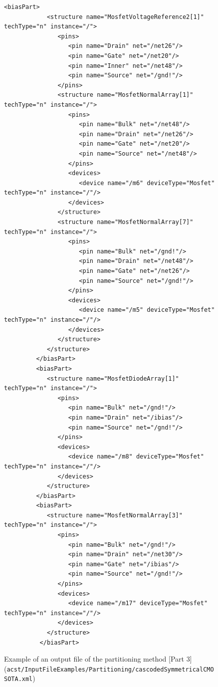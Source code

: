 \begin{figure}[H]
	\begin{lstlisting}[basicstyle=\ttfamily\scriptsize,backgroundcolor={\color{gray!30}}, escapechar=? ]
         <biasPart>
            <structure name="MosfetVoltageReference2[1]" techType="n" instance="/">
               <pins>
                  <pin name="Drain" net="/net26"/>
                  <pin name="Gate" net="/net20"/>
                  <pin name="Inner" net="/net48"/>
                  <pin name="Source" net="/gnd!"/>
               </pins>
               <structure name="MosfetNormalArray[1]" techType="n" instance="/">
		          <pins>
                     <pin name="Bulk" net="/net48"/>
                     <pin name="Drain" net="/net26"/>
                     <pin name="Gate" net="/net20"/>
                     <pin name="Source" net="/net48"/>
                  </pins>
                  <devices>
                     <device name="/m6" deviceType="Mosfet" techType="n" instance="/"/>
		          </devices>
               </structure>
               <structure name="MosfetNormalArray[7]" techType="n" instance="/">
                  <pins>
                     <pin name="Bulk" net="/gnd!"/>
                     <pin name="Drain" net="/net48"/>
                     <pin name="Gate" net="/net26"/>
                     <pin name="Source" net="/gnd!"/>
                  </pins>
                  <devices>
                     <device name="/m5" deviceType="Mosfet" techType="n" instance="/"/>
                  </devices>
               </structure>
            </structure>
         </biasPart>
         <biasPart>
            <structure name="MosfetDiodeArray[1]" techType="n" instance="/">
               <pins>
                  <pin name="Bulk" net="/gnd!"/>
                  <pin name="Drain" net="/ibias"/>
                  <pin name="Source" net="/gnd!"/>
               </pins>
               <devices>
                  <device name="/m8" deviceType="Mosfet" techType="n" instance="/"/>
               </devices>
            </structure>
         </biasPart>
         <biasPart>
            <structure name="MosfetNormalArray[3]" techType="n" instance="/">
               <pins>
                  <pin name="Bulk" net="/gnd!"/>
                  <pin name="Drain" net="/net30"/>
                  <pin name="Gate" net="/ibias"/>
                  <pin name="Source" net="/gnd!"/>
               </pins>
               <devices>
                  <device name="/m17" deviceType="Mosfet" techType="n" instance="/"/>
               </devices>
            </structure>
          </biasPart>
	\end{lstlisting}
	\caption{Example of an output file of the partitioning method [Part 3] ({\tt acst/InputFileExamples/Partitioning/cascodedSymmetricalCMOSOTA.xml})}
\end{figure}

